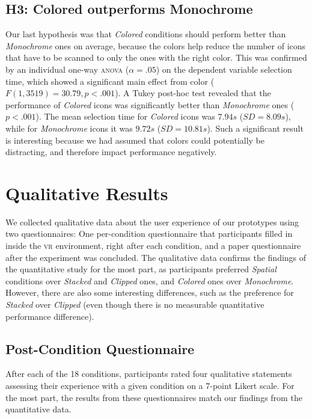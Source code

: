 \documentclass[nobib]{tufte-book} %
\begin{document}
\subsection{H3: Colored outperforms Monochrome}
Our last hypothesis was that \emph{Colored} conditions should perform better than \emph{Monochrome} ones on average, because the colors help reduce the number of icons that have to be scanned to only the ones with the right color. This was confirmed by an individual one-way \textsc{anova} ($\alpha = .05$) on the dependent variable selection time, which showed a significant main effect from color ($F(1,3519) = 30.79, p < .001$).
A Tukey post-hoc test revealed that the performance of \emph{Colored} icons was significantly better than \emph{Monochrome} ones ($p < .001$). The mean selection time for \emph{Colored} icons was $7.94 s$ ($SD = 8.09 s$), while for \emph{Monochrome} icons it was $9.72 s$ ($SD = 10.81 s$). Such a significant result is interesting because we had assumed that colors could potentially be distracting, and therefore impact performance negatively.

\section{Qualitative Results}

We collected qualitative data about the user experience of our prototypes using two questionnaires: One per-condition questionnaire that participants filled in inside the \textsc{vr} environment, right after each condition, and a paper questionnaire after the experiment was concluded. The qualitative data confirms the findings of the quantitative study for the most part, as participants preferred \emph{Spatial} conditions over \emph{Stacked} and \emph{Clipped} ones, and \emph{Colored} ones over \emph{Monochrome}. However, there are also some interesting differences, such as the preference for \emph{Stacked} over \emph{Clipped} (even though there is no measurable quantitative performance difference).

\subsection{Post-Condition Questionnaire}
After each of the 18 conditions, participants rated four qualitative statements assessing their experience with a given condition on a 7-point Likert scale. For the most part, the results from these questionnaires match our findings from the quantitative data.
\end{document}
